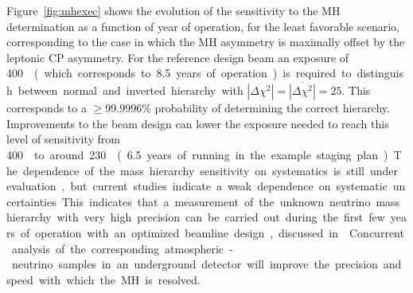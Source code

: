 Figure~\ref{fig:mhexec} shows the evolution of the sensitivity to the MH determination as a function
of year of operation, for the least favorable scenario, corresponding to the case in which the MH asymmetry is
maximally offset by the leptonic CP asymmetry. For the reference design beam an exposure of \SI{400}\ktMWyr{}  
(which corresponds to \num{8.5} years of operation) is required to distinguish
between normal and inverted hierarchy with $|\Delta \chi^2| =
\overline{|\Delta \chi^2|} = 25$.  This corresponds to a $\geq
99.9996\%$ probability of determining the correct hierarchy. 
Improvements to the beam design can
lower the exposure needed to reach this level of sensitivity from
\SI{400}\ktMWyr{} to around \SI{230}\ktMWyr{} (\num{6.5} years of
running in the example staging plan). The dependence of the mass
hierarchy sensitivity on systematics is still under evaluation, but
current studies indicate a weak dependence on systematic
uncertainties. This indicates that a measurement of the unknown
neutrino mass hierarchy with very high precision can be carried out
during the first few years of operation with an optimized beamline
design, discussed in \vollbnf. Concurrent analysis of the corresponding atmospheric-neutrino
samples in an underground detector will improve the precision and
speed with which the MH is resolved.


